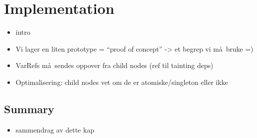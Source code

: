 \chapter{Implementation}
\label{chapter:implementation}

\begin{itemize}
  \item intro
  \item Vi lager en liten prototype = ``proof of concept'' -> et begrep vi m\aa~bruke =)
  \item VarRefs m\aa~sendes oppover fra child nodes (ref til tainting deps)
  \item Optimalisering: child nodes vet om de er atomiske/singleton eller ikke
\end{itemize}





\section{Summary}
\label{sect:impl:summary}
\begin{itemize}
  \item sammendrag av dette kap
\end{itemize}